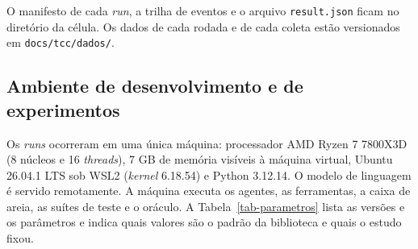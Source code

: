 O manifesto de cada \textit{run}, a trilha de eventos e o arquivo \texttt{result.json} ficam no diretório da célula. Os dados de cada rodada e de cada coleta estão versionados em \texttt{docs/tcc/dados/}.

\subsection{Ambiente de desenvolvimento e de experimentos}
\label{ssec:ambiente}

Os \textit{runs} ocorreram em uma única máquina: processador AMD Ryzen 7 7800X3D (8 núcleos e 16 \textit{threads}), 7 GB de memória visíveis à máquina virtual, Ubuntu 26.04.1 LTS sob WSL2 (\textit{kernel} 6.18.54) e Python 3.12.14. O modelo de linguagem é servido remotamente. A máquina executa os agentes, as ferramentas, a caixa de areia, as suítes de teste e o oráculo. A Tabela~\ref{tab-parametros} lista as versões e os parâmetros e indica quais valores são o padrão da biblioteca e quais o estudo fixou.

